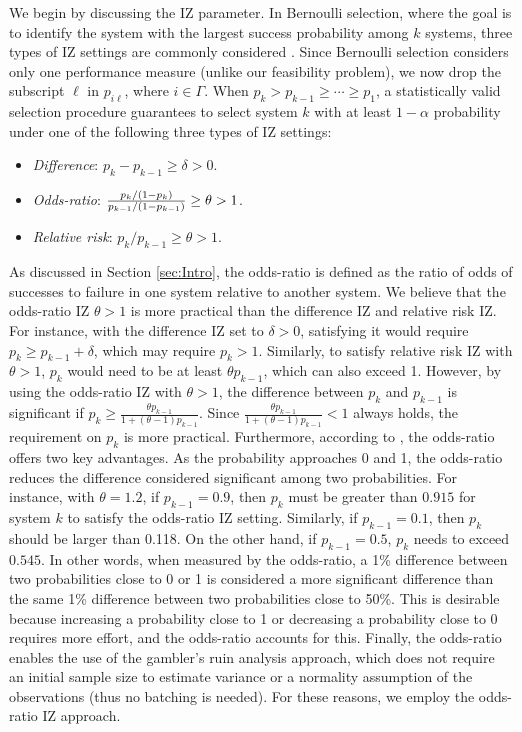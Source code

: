 \documentclass[11pt]{article}
\begin{document}
We begin by discussing the IZ parameter. 
In Bernoulli selection, where the goal is to identify the system with the largest success probability among $k$ systems, three types of IZ settings are commonly considered \citep{wieland2004odds}. Since Bernoulli selection considers only one performance measure (unlike our feasibility problem), we now drop the subscript $\ell$ in $p_{i\ell}$, where $i\in \Gamma$. When $p_k > p_{k-1} \geq \cdots \geq p_1$, a statistically valid selection procedure guarantees to select system $k$ with at least $1-\alpha$ probability under one of the following three types of IZ settings: 

\begin{itemize}
    \item {\it Difference}: $p_k - p_{k-1} \geq \delta >0 $. 
    \item {\it Odds-ratio}: ${p_k/(1-p_k) \over p_{k-1}/(1-p_{k-1})} \geq \theta >1$.
    \item {\it Relative risk}: $p_k/p_{k-1} \geq \theta >1$.
\end{itemize}

As discussed in Section \ref{sec:Intro}, the odds-ratio is defined as the ratio of odds of 
successes to failure in one system relative to another system. We believe that the odds-ratio IZ $\theta>1$ is more practical than the difference IZ and relative risk IZ. For instance, with the difference IZ set to $\delta>0$, satisfying it would require $p_k\geq p_{k-1}+\delta$, which may require $p_k>1$. Similarly, to satisfy relative risk IZ with $\theta>1$, $p_k$ would need to be at least $\theta p_{k-1}$, which can also exceed 1. However, by using the odds-ratio IZ with $\theta>1$, the difference between $p_k$ and $p_{k-1}$ is significant if $p_k\geq \frac{\theta p_{k-1}}{1+(\theta-1)p_{k-1}}$. Since $\frac{\theta p_{k-1}}{1+(\theta-1)p_{k-1}}<1$ always holds, the requirement on $p_k$ is more practical. 
Furthermore, according to \cite{wieland2004odds}, the odds-ratio offers two key advantages. As the probability approaches 0 and 1, the odds-ratio reduces the difference considered significant among two probabilities. For instance, with $\theta=1.2$, if $p_{k-1} = 0.9$, then $p_k$ must be greater than $0.915$ for system $k$ to satisfy the odds-ratio IZ setting. Similarly, if $p_{k-1}=0.1$, then $p_k$ should be larger than 0.118. 
On the other hand, if $p_{k-1} = 0.5$, $p_k$ needs to exceed $0.545$. In other words, when measured by the odds-ratio, a 1\% difference between two probabilities close to 0 or 1 is considered a more significant difference than the same 1\% difference between two probabilities close to 50\%. This is desirable because increasing a probability close to 1 or decreasing a probability close to 0 requires more effort, and the odds-ratio accounts for this.
Finally, the odds-ratio enables the use of the gambler's ruin analysis approach, which does not require an initial sample size to estimate variance or a normality assumption of the observations (thus no batching is needed). 
For these reasons, we employ the odds-ratio IZ approach. 
\end{document}
